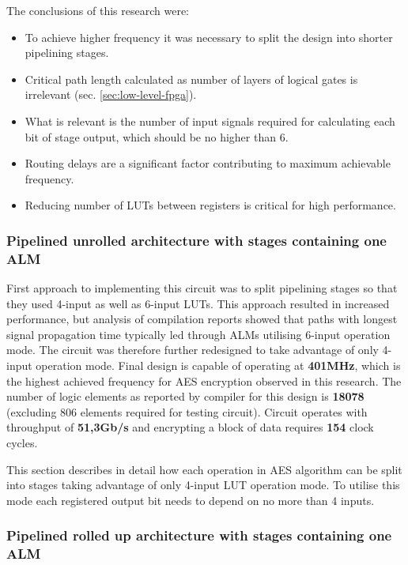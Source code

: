 The conclusions of this research were:
\begin{itemize}[noitemsep]
\item To achieve higher frequency it was necessary to split the design into shorter pipelining stages.
\item Critical path length calculated as number of layers of logical gates is irrelevant (sec. \ref{sec:low-level-fpga}).
\item What is relevant is the number of input signals required for calculating each bit of stage output, which should be no higher than 6.
\item Routing delays are a significant factor contributing to maximum achievable frequency.
\item Reducing number of LUTs between registers is critical for high performance.
\end{itemize}

\subsubsection{Pipelined unrolled architecture with stages containing one ALM}
\label{sec:implementation-pipe-unrolled-one-alm}

First approach to implementing this circuit was to split pipelining stages so that they used 4-input as well as 6-input LUTs. This approach resulted in increased performance, but analysis of compilation reports showed that paths with longest signal propagation time typically led through ALMs utilising 6-input operation mode. The circuit was therefore further redesigned to take advantage of only 4-input operation mode. Final design is capable of operating at \textbf{401MHz}, which is the highest achieved frequency for AES encryption observed in this research. The number of logic elements as reported by compiler for this design is \textbf{18078} (excluding 806 elements required for testing circuit). Circuit operates with throughput of \textbf{51,3Gb/s} and encrypting a block of data requires \textbf{154} clock cycles.

This section describes in detail how each operation in AES algorithm can be split into stages taking advantage of only 4-input LUT operation mode. To utilise this mode each registered output bit needs to depend on no more than 4 inputs.



\newpage


\subsubsection{Pipelined rolled up architecture with stages containing one ALM}

